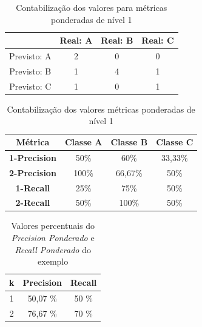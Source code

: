 \begin{table}[h!]
  \begin{center}
    \begin{tabular}{cccc}
      \hline
         & \textbf{Real: A} & \textbf{Real: B} & \textbf{Real: C} \\
      \hline

      Previsto: A & 2 & 0 & 0\\
      Previsto: B & 1 & 4 & 1\\
      Previsto: C & 1 & 0 & 1\\

      \hline
    \end{tabular}
    \caption{Contabilização dos valores para métricas ponderadas de nível 1}
    \label{tab:confusao2}
  \end{center}
\end{table}

\begin{table}[h!]
  \begin{center}
    \begin{tabular}{cccc}
      \hline
       Métrica  & \textbf{Classe A} & \textbf{Classe B} & \textbf{Classe C} \\
      \hline

      \textbf{1-Precision} & 50\% & 60\% & 33,33\% \\
      \textbf{2-Precision} & 100\% & 66,67\% & 50\% \\
      \textbf{1-Recall} & 25\% & 75\% & 50\% \\
      \textbf{2-Recall} & 50\% & 100\% & 50\% \\
      
      \hline
    \end{tabular}
    \caption{Contabilização dos valores métricas ponderadas de nível 1}
    \label{tab:valores_classes}
  \end{center}
\end{table}

\begin{table}[h!]
  \begin{center}
    \begin{tabular}{ccc}
      \hline
      \textbf{k} & \textbf{Precision} & \textbf{Recall} \\
      \hline

      1 & 50,07 \% & 50 \% \\
      2 & 76,67 \% & 70 \% \\

      \hline
    \end{tabular}
    \caption{Valores percentuais do \textit{Precision Ponderado} e \textit{Recall Ponderado} do exemplo}
    \label{tab:valores_pon}
  \end{center}
\end{table}

